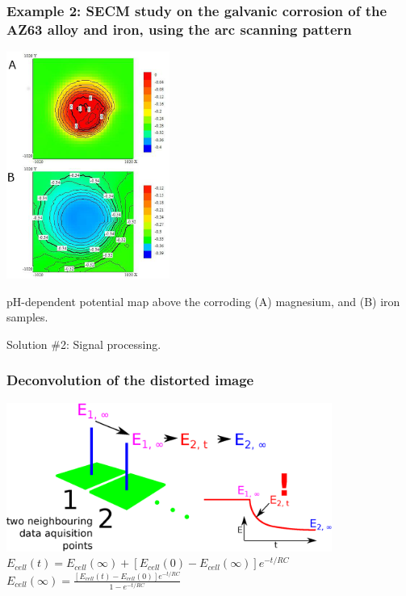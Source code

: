 \documentclass{beamer}
\begin{document}
\begin{frame}
	\frametitle{Example 2: SECM study on the galvanic corrosion of the AZ63 alloy and iron, using the arc scanning pattern}
	\centering
	\includegraphics[width=0.4\textwidth]{galvanic.eps}
	
	pH-dependent potential map above the corroding (A) magnesium, and (B) iron samples.
\end{frame}



\begin{frame}
\centering
Solution \#2: Signal processing.
\end{frame}

\begin{frame}
\frametitle{Deconvolution of the distorted image}
\centering	
\includegraphics[width=0.8\textwidth]{t.eps}\\
\vfill
$E_{cell}(t) = E_{cell}(\infty) + [E_{cell}(0) - E_{cell}(\infty)]e^{-t/RC}$\\
\vfill
$E_{cell}(\infty)	= \frac {\displaystyle [E_{cell}(t) - E_{cell}(0)]e^{-t/RC}}	{\displaystyle 1 - e^{-t/RC}}$
\end{frame}
\end{document}
